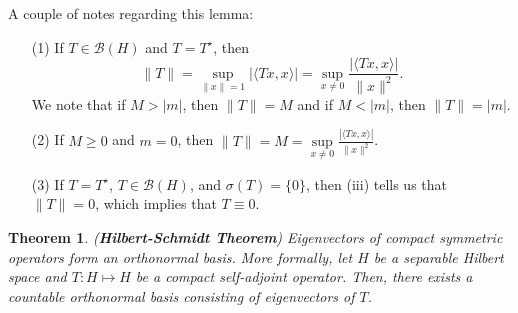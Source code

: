 \documentclass[12pt]{article}
\newtheorem{theorem}{Theorem}
\newcommand{\B}{\mathscr{B}}
\newcommand{\la}{\langle}
\newcommand{\ra}{\rangle}
\newcommand{\Ts}{T^{\star}}
\begin{document}
\vspace{-25pt}
A couple of notes regarding this lemma:
\begin{enumerate}[topsep=-15pt, itemsep=0pt]
\item[(1)] If $T \in \B(H)$ and $T = \Ts$, then 
\[ \| T \| = \sup\limits_{\| x \| = 1 } |\la Tx, x \ra | = \sup\limits_{x \neq 0} \frac{|\la Tx, x \ra |}{\| x \|^2}. \] We note that if $M > |m|$, then $\| T \| = M$ and if $M < |m|$, then $\| T \| = |m|$.
\item[(2)] If $M \geq 0$ and $m = 0$, then $\| T \| = M = \sup\limits_{x \neq 0} \frac{|\la Tx, x \ra|}{\| x \|^2}$. 
\item[(3)] If $ T = \Ts$, $T \in \B(H)$, and $\sigma(T) = \{ 0 \}$, then (iii) tells us that $\| T \| = 0$, which implies that $T \equiv 0$. 
\end{enumerate}
\begin{theorem} (\textbf{Hilbert-Schmidt Theorem})
Eigenvectors of compact symmetric operators form an orthonormal basis. More formally, let $H$ be a separable Hilbert space and $T: H \mapsto H$ be a compact self-adjoint operator. Then, there exists a countable orthonormal basis consisting of eigenvectors of $T$. 
\end{theorem}
\vspace{-25pt}
\end{document}
